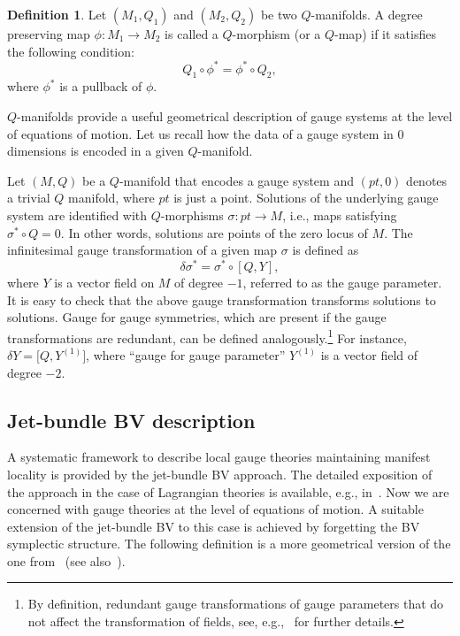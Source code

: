 \documentclass[10pt,a4paper]{amsart}
\numberwithin{equation}{section}
\theoremstyle{definition}
\newtheorem{Definition}[Theorem]{Definition}
\newcommand{\changed}[1]{{#1}}
\begin{document}
\begin{Definition}
 Let $(M_1,Q_1)$ and $(M_2,Q_2)$ be two $Q$-manifolds. A degree preserving map $\phi\colon M_1\rightarrow M_2$ is called a $Q$-morphism (or a $Q$-map) if it satisfies the following condition:
 \begin{equation*}
 Q_1\circ\phi^*=\phi^*\circ Q_2,
 \end{equation*}
 where $\phi^*$ is a pullback of $\phi$.
\end{Definition}

$Q$-manifolds provide a useful geometrical description of gauge systems at the level of equations of motion. Let us recall how the data of a gauge system in $0$ dimensions is encoded in a given $Q$-manifold.

Let $(M,Q)$ be a $Q$-manifold that encodes a gauge system and $(pt,0)$ denotes a trivial $Q$ manifold, where $pt$ is just a point. Solutions of the underlying gauge system are identified with $Q$-morphisms $\sigma\colon pt\rightarrow M$, i.e., maps satisfying $\sigma^*\circ Q=0$. In other words, solutions are points of the zero locus of $M$. The infinitesimal gauge transformation of a given map $\sigma$ is defined as
\begin{equation*}
 \delta\sigma^*=\sigma^*\circ[Q,Y],
\end{equation*}
where $Y$ is a vector field on $M$ of degree $-1$, referred to as the gauge parameter. It is easy to check that the above gauge transformation transforms solutions to solutions. \changed{Gauge for gauge symmetries, which are present if the gauge transformations are redundant, can be defined analogously.}\footnote{\changed{By definition, redundant gauge transformations of gauge parameters that do not affect the transformation of fields, see, e.g.,~\cite{Gomis:1995he, HT-book} for further details.}} For instance, $\delta Y=\bigl[Q,Y^{(1)}\bigr]$, where ``gauge for gauge parameter'' $Y^{(1)}$ is a vector field of degree $-2$.


\subsection{Jet-bundle BV description}

A systematic framework to describe local gauge theories maintaining manifest locality is provided by the jet-bundle BV approach. The detailed exposition of the approach in the case of Lagrangian theories is available, e.g., in~\cite{Barnich:2000zw}. Now we are concerned with gauge theories at the level of equations of motion. A suitable extension of the jet-bundle BV to this case is achieved by forgetting the BV symplectic structure. The following definition is a more geometrical version of the one from~\cite{Barnich:2004cr} (see also~\cite{Barnich:2006hbb,Barnich:2010sw,Grigoriev:2022zlq,Kazinski:2005eb}).
\end{document}
